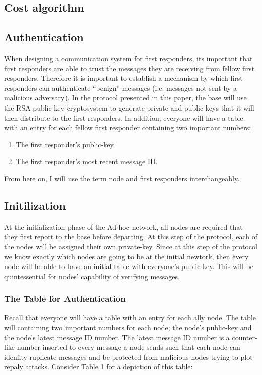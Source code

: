 \documentclass[letterpaper]{article}
\begin{document}
\subsection{Cost algorithm}

\subsection{Authentication}
When designing a communication system for first responders, its important that first responders are able to trust the messages they are receiving from fellow first responders. Therefore it is important to establish a mechanism by which first responders can authenticate “benign” messages (i.e. messages not sent by a malicious adversary). In the protocol presented in this paper, the base will use the RSA public-key cryptosystem to generate private and public-keys that it will then distribute to the first responders. In addition, everyone will have a table with an entry for each fellow first responder containing two important numbers:

\begin{enumerate}
  \item The first responder's public-key. 
  \item The first responder's most recent message ID.
\end{enumerate}

From here on, I will use the term node and first responders interchangeably.

\subsection{Initilization}
At the initialization phase of the Ad-hoc network, all nodes are required that they first report to the base before departing. 
At this step of the protocol, each of the nodes will be assigned their own private-key. 
Since at this step of the protocol we know exactly which nodes are going to be at the initial newtork, then every node will be able to have an initial table with everyone's public-key. 
This will be quintessential for nodes' capability of verifying messages.

\subsubsection{The Table for Authentication}
Recall that everyone will have a table with an entry for each ally node. The table will containing two important numbers for each node; the node's public-key and the node's latest message ID number. The latest message ID number is a counter-like number inserted to every message a node sends such that each node can idenfity ruplicate messages and be protected from malicious nodes trying to plot repaly attacks. Consider Table 1 for a depiction of this table:
\end{document}
